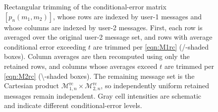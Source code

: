 \documentclass[11pt,onecolumn]{IEEEtran}
\begin{document}
\begin{figure}[t]
{%
}

\endgroup
\caption{Rectangular trimming of the conditional-error matrix $[  p_n(m_1, m_2)]$,
whose rows are indexed by user-1 messages and whose columns are indexed by
user-2 messages. First, each row is averaged over the original user-2 message
set, and rows with average conditional error exceeding $t$ are trimmed per  \eqref{eqn:M1rc}
(/-shaded  boxes). Column averages are then recomputed using only the
retained rows, and columns whose averages exceed $t$ are trimmed  per \eqref{eqn:M2rc} (\textbackslash-shaded
boxes). The remaining message set is the Cartesian product
$\mathcal M_{1,n}^{\mathrm{rc}}\times
\mathcal M_{2,n}^{\mathrm{rc}}$, so independently uniform retained messages
remain independent. Gray cell intensities are schematic and indicate
different conditional-error levels.}
\label{fig:rectangular-trimming}
\end{figure}
\end{document}
